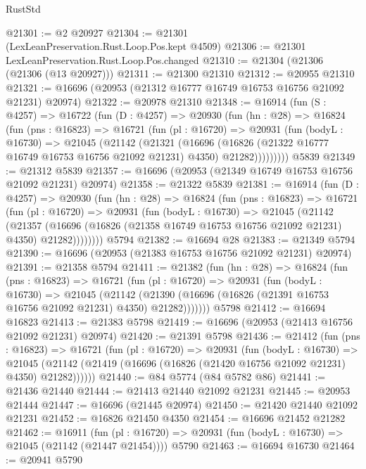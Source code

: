 \begin{lexlean}{RustStd}
\begin{coremodule}
@21301 := @2 @20927
@21304 := @21301 (LexLeanPreservation.Rust.Loop.Pos.kept @4509)
@21306 := @21301 LexLeanPreservation.Rust.Loop.Pos.changed
@21310 := @21304 (@21306 (@21306 (@13 @20927)))
@21311 := @21300 @21310
@21312 := @20955 @21310
@21321 := @16696 (@20953 (@21312 @16777 @16749 @16753 @16756 @21092 @21231) @20974)
@21322 := @20978 @21310
@21348 := @16914
    (fun (S : @4257) =>
    @16722
      (fun (D : @4257) =>
      @20930
        (fun (hn : @28) =>
        @16824
          (fun (pns : @16823) =>
          @16721
            (fun (pl : @16720) =>
            @20931
              (fun (bodyL : @16730) =>
              @21045
                (@21142
                  (@21321
                    (@16696
                      (@16826 (@21322 @16777 @16749 @16753 @16756 @21092 @21231) @4350)
                      @21282)))))))))
    @5839
@21349 := @21312 @5839
@21357 := @16696 (@20953 (@21349 @16749 @16753 @16756 @21092 @21231) @20974)
@21358 := @21322 @5839
@21381 := @16914
    (fun (D : @4257) =>
    @20930
      (fun (hn : @28) =>
      @16824
        (fun (pns : @16823) =>
        @16721
          (fun (pl : @16720) =>
          @20931
            (fun (bodyL : @16730) =>
            @21045
              (@21142
                (@21357
                  (@16696 (@16826 (@21358 @16749 @16753 @16756 @21092 @21231) @4350) @21282))))))))
    @5794
@21382 := @16694 @28
@21383 := @21349 @5794
@21390 := @16696 (@20953 (@21383 @16753 @16756 @21092 @21231) @20974)
@21391 := @21358 @5794
@21411 := @21382
    (fun (hn : @28) =>
    @16824
      (fun (pns : @16823) =>
      @16721
        (fun (pl : @16720) =>
        @20931
          (fun (bodyL : @16730) =>
          @21045
            (@21142
              (@21390 (@16696 (@16826 (@21391 @16753 @16756 @21092 @21231) @4350) @21282)))))))
    @5798
@21412 := @16694 @16823
@21413 := @21383 @5798
@21419 := @16696 (@20953 (@21413 @16756 @21092 @21231) @20974)
@21420 := @21391 @5798
@21436 := @21412
    (fun (pns : @16823) =>
    @16721
      (fun (pl : @16720) =>
      @20931
        (fun (bodyL : @16730) =>
        @21045 (@21142 (@21419 (@16696 (@16826 (@21420 @16756 @21092 @21231) @4350) @21282))))))
@21440 := @84 @5774 (@84 @5782 @86)
@21441 := @21436 @21440
@21444 := @21413 @21440 @21092 @21231
@21445 := @20953 @21444
@21447 := @16696 (@21445 @20974)
@21450 := @21420 @21440 @21092 @21231
@21452 := @16826 @21450 @4350
@21454 := @16696 @21452 @21282
@21462 := @16911
    (fun (pl : @16720) => @20931 (fun (bodyL : @16730) => @21045 (@21142 (@21447 @21454))))
    @5790
@21463 := @16694 @16730
@21464 := @20941 @5790

\end{coremodule}
\end{lexlean}
